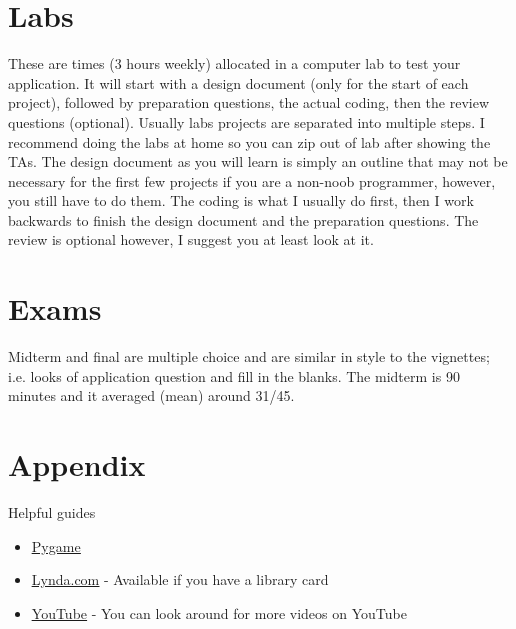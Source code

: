 \documentclass[12pt]{article}
\begin{document}
\section{Labs}
These are times (3 hours weekly) allocated in a computer lab to test your application. It will start with a design document (only for the start of each project), followed by preparation questions, the actual coding, then the review questions (optional). Usually labs projects are separated into multiple steps. I recommend doing the labs at home so you can zip out of lab after showing the TAs. The design document as you will learn is simply an outline that may not be necessary for the first few projects if you are a non-noob programmer, however, you still have to do them. The coding is what I usually do first, then I work backwards to finish the design document and the preparation questions. The review is optional however, I suggest you at least look at it. 

\section{Exams}
Midterm and final are multiple choice and are similar in style to the vignettes; i.e. looks of application question and fill in the blanks. The midterm is 90 minutes and it averaged (mean) around 31/45. 

\appendix
\section{Appendix}
Helpful guides
\begin{itemize}
  \item \underline{\href{run:https://www.pygame.org/docs/}{Pygame}}
  \item \underline{\href{run:https://www.lynda.com/Python-tutorials/Python-Essential-Training/614299-2.html?org=reginalibrary}{Lynda.com}} - Available if you have a library card
  \item \underline{\href{https://www.youtube.com/watch?v=_uQrJ0TkZlc}{YouTube}} - You can look around for more videos on YouTube
\end{itemize}
\end{document}
